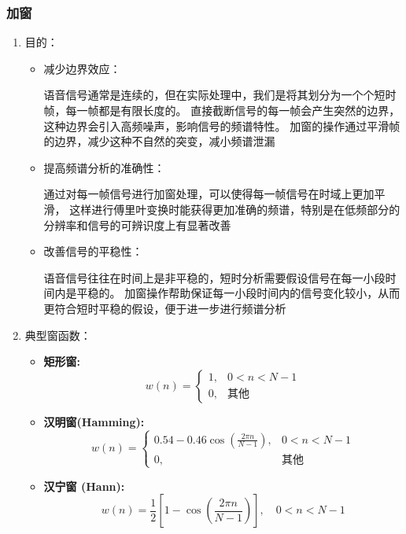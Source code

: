 \documentclass[a4paper]{article}
\begin{document}
\subsubsection{加窗}
\begin{enumerate}
  \item 
  {
    目的：
    \begin{itemize}
      \item 减少边界效应：

      语音信号通常是连续的，但在实际处理中，我们是将其划分为一个个短时帧，每一帧都是有限长度的。
      直接截断信号的每一帧会产生突然的边界，这种边界会引入高频噪声，影响信号的频谱特性。
      加窗的操作通过平滑帧的边界，减少这种不自然的突变，减小频谱泄漏
      \item 提高频谱分析的准确性：

      通过对每一帧信号进行加窗处理，可以使得每一帧信号在时域上更加平滑，
      这样进行傅里叶变换时能获得更加准确的频谱，特别是在低频部分的分辨率和信号的可辨识度上有显著改善
      \item 改善信号的平稳性：

      语音信号往往在时间上是非平稳的，短时分析需要假设信号在每一小段时间内是平稳的。
      加窗操作帮助保证每一小段时间内的信号变化较小，从而更符合短时平稳的假设，便于进一步进行频谱分析
    \end{itemize}
  }
  \item 
  {
    典型窗函数：
    \begin{itemize}
      \item \textbf{矩形窗:}
      \begin{equation}
        w(n) = 
        \begin{cases} 
        1, & 0 < n < N-1 \\
        0, & \text{其他}
        \end{cases}
        \label{eq:retangle}
      \end{equation}

      \item \textbf{汉明窗(Hamming):}
      \begin{equation}
        w(n) = 
        \begin{cases} 
        0.54 - 0.46 \cos\left( \frac{2\pi n}{N-1} \right), & 0 < n < N-1 \\
        0, & \text{其他}
        \end{cases}
        \label{eq:Hamming}
      \end{equation}

      \item \textbf{汉宁窗 (Hann):}
      \begin{equation}
        w(n) = \frac{1}{2} \left[ 1 - \cos\left( \frac{2\pi n}{N-1} \right) \right], \quad 0 < n < N-1
        \label{eq:Hann}
      \end{equation}
  

\end{itemize}}
\end{enumerate}
\end{document}
